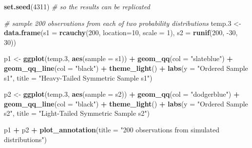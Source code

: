 \documentclass[
]{book}
\newenvironment{Shaded}{\begin{snugshade}}{\end{snugshade}}
\newcommand{\CommentTok}[1]{\textcolor[rgb]{0.56,0.35,0.01}{\textit{#1}}}
\newcommand{\DataTypeTok}[1]{\textcolor[rgb]{0.13,0.29,0.53}{#1}}
\newcommand{\DecValTok}[1]{\textcolor[rgb]{0.00,0.00,0.81}{#1}}
\newcommand{\FloatTok}[1]{\textcolor[rgb]{0.00,0.00,0.81}{#1}}
\newcommand{\KeywordTok}[1]{\textcolor[rgb]{0.13,0.29,0.53}{\textbf{#1}}}
\newcommand{\NormalTok}[1]{#1}
\newcommand{\OperatorTok}[1]{\textcolor[rgb]{0.81,0.36,0.00}{\textbf{#1}}}
\newcommand{\StringTok}[1]{\textcolor[rgb]{0.31,0.60,0.02}{#1}}
\begin{document}
\begin{Shaded}
\begin{Highlighting}[]
\KeywordTok{set.seed}\NormalTok{(}\DecValTok{4311}\NormalTok{) }\CommentTok{# so the results can be replicated}

\CommentTok{# sample 200 observations from each of two probability distributions}
\NormalTok{temp}\FloatTok{.3}\NormalTok{ <-}\StringTok{ }\KeywordTok{data.frame}\NormalTok{(}\DataTypeTok{s1 =} \KeywordTok{rcauchy}\NormalTok{(}\DecValTok{200}\NormalTok{, }\DataTypeTok{location=}\DecValTok{10}\NormalTok{, }\DataTypeTok{scale =} \DecValTok{1}\NormalTok{),}
                     \DataTypeTok{s2 =} \KeywordTok{runif}\NormalTok{(}\DecValTok{200}\NormalTok{, }\DecValTok{-30}\NormalTok{, }\DecValTok{30}\NormalTok{)) }

\NormalTok{p1 <-}\StringTok{ }\KeywordTok{ggplot}\NormalTok{(temp}\FloatTok{.3}\NormalTok{, }\KeywordTok{aes}\NormalTok{(}\DataTypeTok{sample =}\NormalTok{ s1)) }\OperatorTok{+}
\StringTok{    }\KeywordTok{geom_qq}\NormalTok{(}\DataTypeTok{col =} \StringTok{"slateblue"}\NormalTok{) }\OperatorTok{+}\StringTok{ }\KeywordTok{geom_qq_line}\NormalTok{(}\DataTypeTok{col =} \StringTok{"black"}\NormalTok{) }\OperatorTok{+}
\StringTok{    }\KeywordTok{theme_light}\NormalTok{() }\OperatorTok{+}
\StringTok{    }\KeywordTok{labs}\NormalTok{(}\DataTypeTok{y =} \StringTok{"Ordered Sample s1"}\NormalTok{,}
         \DataTypeTok{title =} \StringTok{"Heavy-Tailed Symmetric Sample s1"}\NormalTok{)}

\NormalTok{p2 <-}\StringTok{ }\KeywordTok{ggplot}\NormalTok{(temp}\FloatTok{.3}\NormalTok{, }\KeywordTok{aes}\NormalTok{(}\DataTypeTok{sample =}\NormalTok{ s2)) }\OperatorTok{+}
\StringTok{    }\KeywordTok{geom_qq}\NormalTok{(}\DataTypeTok{col =} \StringTok{"dodgerblue"}\NormalTok{) }\OperatorTok{+}\StringTok{ }\KeywordTok{geom_qq_line}\NormalTok{(}\DataTypeTok{col =} \StringTok{"black"}\NormalTok{) }\OperatorTok{+}
\StringTok{    }\KeywordTok{theme_light}\NormalTok{() }\OperatorTok{+}
\StringTok{    }\KeywordTok{labs}\NormalTok{(}\DataTypeTok{y =} \StringTok{"Ordered Sample s2"}\NormalTok{,}
         \DataTypeTok{title =} \StringTok{"Light-Tailed Symmetric Sample s2"}\NormalTok{)}

\NormalTok{p1 }\OperatorTok{+}\StringTok{ }\NormalTok{p2 }\OperatorTok{+}\StringTok{ }\KeywordTok{plot_annotation}\NormalTok{(}\DataTypeTok{title =} \StringTok{"200 observations from simulated distributions"}\NormalTok{)}
\end{Highlighting}
\end{Shaded}
\end{document}
